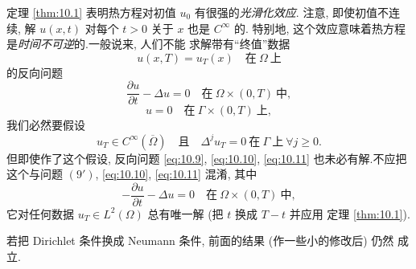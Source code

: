 \begin{keyremark}
\label{rem:10.1}
定理  \ref{thm:10.1} 表明热方程对初值 $u_0$ 有很强的\emph{光滑化效应}.
注意, 即使初值不连续, 解 $u(x,t)$ 对每个 $t>0$ 关于 $x$ 也是 $C^\infty$ 的.
特别地, 这个效应意味着热方程是\emph{时间不可逆}的.一般说来, 人们不能
求解带有``终值''数据
\begin{equation}
u(x,T)=u_T(x)\quad\text{在}\ \Omega\ \text{上}
\label{eq:10.11}
\end{equation}
的反向问题
\begin{equation}
\frac{\partial u}{\partial t}-\Delta u=0\quad\text{在}\ \Omega\times(0,T)\ \text{中},
\label{eq:10.9}
\end{equation}
\begin{equation}
u=0\quad\text{在}\ \Gamma\times(0,T)\ \text{上},
\label{eq:10.10}
\end{equation}
我们必然要假设
\begin{equation*}
u_T\in C^\infty(\overline\Omega)
\quad\text{且}\quad
\Delta^ju_T=0\ \text{在}\ \Gamma\ \text{上}\ \forall j\ge0.
\end{equation*}
但即使作了这个假设, 反向问题 \eqref{eq:10.9}, \eqref{eq:10.10}, \eqref{eq:10.11} 也未必有解.不应把这个与问题 $(9')$, \eqref{eq:10.10}, \eqref{eq:10.11} 混淆, 其中
\begin{equation*}
-\frac{\partial u}{\partial t}-\Delta u=0
\quad\text{在}\ \Omega\times(0,T)\ \text{中},
\tag*{(9$'$)}
\end{equation*}
它对任何数据 $u_T\in L^2(\Omega)$ 总有唯一解 (把 $t$ 换成 $T-t$ 并应用
定理  \ref{thm:10.1}).
\end{keyremark}

\begin{remark}
\label{rem:10.2}
若把 Dirichlet 条件换成 Neumann 条件, 前面的结果 (作一些小的修改后) 仍然
成立.
\end{remark}

